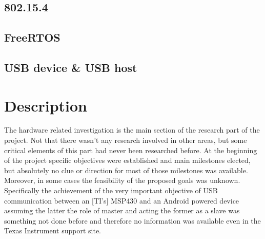 		\subsection{802.15.4}
		\subsection{FreeRTOS}
		\subsection{USB device \& USB host}

	\section{Description}



	The hardware related investigation is the main section of the research part of the project. Not that there wasn't any research involved in other areas, but some critical elements of this part had never been researched before. 
	At the beginning of the project specific objectives were established and main milestones elected, but absolutely no clue or direction for most of those milestones was available.
	Moreover, in some cases the feasibility of the proposed goals was unknown. Specifically the achievement of the very important objective of USB communication between an [TI's] MSP430 %
	and an Android powered device assuming the latter the role of master and acting the former as a slave was something not done before and therefore no information was available  even in the Texas Instrument support site.\\

